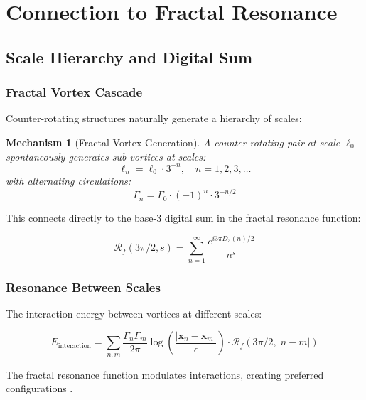 \documentclass[12pt]{article}
\newcommand{\fractalres}{\mathcal{R}_f}
\newcommand{\digitalsum}{D_3}
\newtheorem{mechanism}[theorem]{Mechanism}
\begin{document}
\section{Connection to Fractal Resonance}

\subsection{Scale Hierarchy and Digital Sum}

\subsubsection{Fractal Vortex Cascade}

Counter-rotating structures naturally generate a hierarchy of scales:

\begin{mechanism}[Fractal Vortex Generation]
A counter-rotating pair at scale $\ell_0$ spontaneously generates sub-vortices at scales:
\begin{equation}
\ell_n = \ell_0 \cdot 3^{-n}, \quad n = 1, 2, 3, \ldots
\end{equation}
with alternating circulations:
\begin{equation}
\Gamma_n = \Gamma_0 \cdot (-1)^n \cdot 3^{-n/2}
\end{equation}
\end{mechanism}

This connects directly to the base-3 digital sum in the fractal resonance function:

\begin{equation}
\fractalres(3\pi/2, s) = \sum_{n=1}^{\infty} \frac{e^{i3\pi\digitalsum(n)/2}}{n^s}
\end{equation}

\subsubsection{Resonance Between Scales}

The interaction energy between vortices at different scales:

\begin{equation}
E_{\text{interaction}} = \sum_{n,m} \frac{\Gamma_n \Gamma_m}{2\pi} \log\left(\frac{|\mathbf{x}_n - \mathbf{x}_m|}{\epsilon}\right) \cdot \fractalres(3\pi/2, |n-m|)
\end{equation}

The fractal resonance function modulates interactions, creating preferred configurations \cite{chorin1994,frisch1995}.
\end{document}
